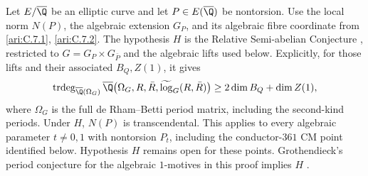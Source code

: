 



\begin{proposition}\hypertarget{tag-001D}{}\label{ari:C.7.4}
Let $E/\overline\Q$ be an elliptic curve and let
$P\in E(\overline\Q)$ be nontorsion. Use the local norm $N(P)$,
the algebraic extension $G_P$, and its algebraic fibre coordinate
from \cref{ari:C.7.1}, \cref{ari:C.7.2}.
The hypothesis $H$ is the Relative Semi-abelian Conjecture
\cite[Conjecture~4.7, p.~18]{bertolin2022}, restricted to
$G=G_P\times G_{\bar P}$ and the algebraic lifts used below.
Explicitly, for those lifts and their associated $B_Q,Z(1)$, it gives
\[
 \operatorname{trdeg}_{\overline\Q(\Omega_G)}
 \overline\Q\bigl(\Omega_G,R,\bar R,
                  \widetilde{\log}_G(R,\bar R)\bigr)
 \geq 2\dim B_Q+\dim Z(1),
\]
where $\Omega_G$ is the full de Rham--Betti period matrix,
including the second-kind periods. Under $H$, $N(P)$ is
transcendental. This applies to every algebraic parameter
$t\ne0,1$ with nontorsion $P_t$, including the conductor-$361$
CM point identified below. Hypothesis $H$ remains open for
these points. Grothendieck's period conjecture for the algebraic
$1$-motives in this proof implies $H$
\cite[Proposition~4.12, pp.~19--20]{bertolin2022}.
\end{proposition}

